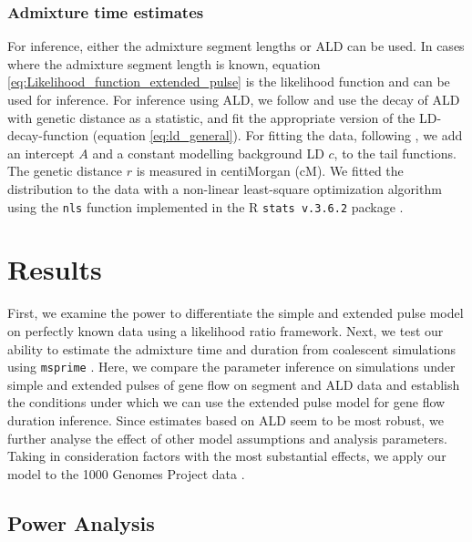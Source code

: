\documentclass[11pt]{article}
\begin{document}
\subsubsection{Admixture time estimates}\label{admixture time estimates}
For inference, either the admixture segment lengths or ALD can be used. In cases where the admixture segment length is known, equation \ref{eq:Likelihood_function_extended_pulse} is the likelihood function and can be used for inference. For inference using ALD,  we follow \cite{moorjani_history_2011} and use the decay of ALD with genetic distance as a statistic, and fit the appropriate version of the LD-decay-function (equation \ref{eq:ld_general}). For fitting the data, following \cite{moorjani_genetic_2016}, we add an intercept $A$ and a constant modelling background LD $c$, to the tail functions. The genetic distance $r$ is measured in centiMorgan (cM). We fitted the distribution to the data with  a non-linear least-square optimization algorithm using the \texttt{nls} function implemented in the R \texttt{stats v.3.6.2} package \citep{R_Core_Team_2019}.

\section{Results}\label{results}


First, we examine the power to differentiate the simple and extended pulse model on perfectly known data using a likelihood ratio framework. Next, we test our ability to estimate the admixture time and duration from coalescent simulations using \texttt{msprime} \citep{kelleher_efficient_2016}. Here, we compare the parameter inference on simulations under simple and extended pulses of gene flow on segment and ALD data and establish the conditions under which we can use the extended pulse model for gene flow duration inference. Since estimates based on ALD seem to be most robust, we further analyse the effect of other model assumptions and analysis parameters. Taking in consideration factors with the most substantial effects, we apply our model to the 1000 Genomes Project data \citep{the_1000_genomes_project_consortium_global_2015}.

\subsection{Power Analysis}\label{Power Analysis}
\end{document}
